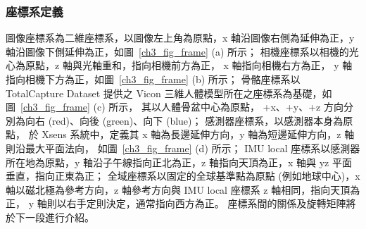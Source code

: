 \subsubsection{座標系定義}
圖像座標系為二維座標系，以圖像左上角為原點，x 軸沿圖像右側為延伸為正，y 軸沿圖像下側延伸為正，如圖~\ref{ch3_fig_frame} (a) 所示；
相機座標系以相機的光心為原點，z 軸與光軸重和，指向相機前方為正， x 軸指向相機右方為正， y 軸指向相機下方為正，如圖~\ref{ch3_fig_frame} (b) 所示；
骨骼座標系以 TotalCapture Dataset 提供之 Vicon 三維人體模型所在之座標系為基礎，如圖~\ref{ch3_fig_frame} (c) 所示，
其以人體骨盆中心為原點， +x、+y、+z 方向分別為向右 (red)、向後 (green)、向下 (blue)；
感測器座標系，以感測器本身為原點，
於 Xsens 系統中，定義其 x 軸為長邊延伸方向，y 軸為短邊延伸方向，z 軸則沿最大平面法向，
如圖~\ref{ch3_fig_frame} (d) 所示；
IMU local 座標系以感測器所在地為原點，y 軸沿子午線指向正北為正，z 軸指向天頂為正，x 軸與 yz 平面垂直，指向正東為正；
全域座標系以固定的全球基準點為原點 (例如地球中心)，x 軸以磁北極為參考方向，z 軸參考方向與 IMU local 座標系 z 軸相同，指向天頂為正，
y 軸則以右手定則決定，通常指向西方為正。
座標系間的關係及旋轉矩陣將於下一段進行介紹。

